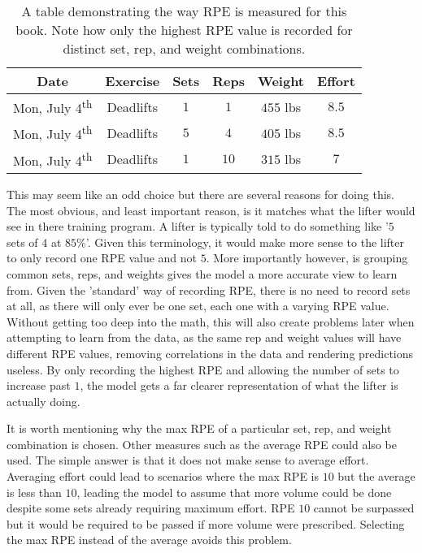 \begin{table}[h]
	\centering
	\begin{tabular}{c|c|c|c|c|c}
		Date & Exercise & Sets & Reps & Weight & Effort \\
        \hline
        Mon, July 4\textsuperscript{th} & Deadlifts & $1$ & $1$ & $455$ lbs & $8.5$ \\
        Mon, July 4\textsuperscript{th} & Deadlifts & $5$ & $4$ & $405$ lbs & $8.5$ \\
        Mon, July 4\textsuperscript{th} & Deadlifts & $1$ & $10$ & $315$ lbs & $7$ \\
	\end{tabular}
	\caption{A table demonstrating the way RPE is measured for this book. Note how only the highest RPE value is recorded for distinct set, rep, and weight combinations.}
	\label{tab:NonStandardRPEExample}
\end{table}

This may seem like an odd choice but there are several reasons for doing this. The most obvious, and least important reason, is it matches what the lifter would see in there training program. A lifter is typically told to do something like '$5$ sets of $4$ at $85$\%'. Given this terminology, it would make more sense to the lifter to only record one RPE value and not $5$. More importantly however, is grouping common sets, reps, and weights gives the model a more accurate view to learn from. Given the 'standard' way of recording RPE, there is no need to record sets at all, as there will only ever be one set, each one with a varying RPE value. Without getting too deep into the math, this will also create problems later when attempting to learn from the data, as the same rep and weight values will have different RPE values, removing correlations in the data and rendering predictions useless. By only recording the highest RPE and allowing the number of sets to increase past $1$, the model gets a far clearer representation of what the lifter is actually doing.

It is worth mentioning why the max RPE of a particular set, rep, and weight combination is chosen. Other measures such as the average RPE could also be used. The simple answer is that it does not make sense to average effort. Averaging effort could lead to scenarios where the max RPE is $10$ but the average is less than $10$, leading the model to assume that more volume could be done despite some sets already requiring maximum effort. RPE $10$ cannot be surpassed but it would be required to be passed if more volume were prescribed. Selecting the max RPE instead of the average avoids this problem.

